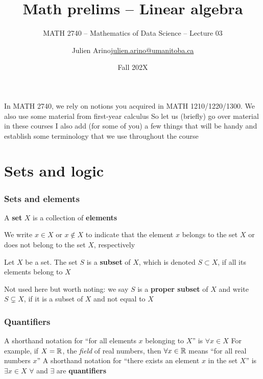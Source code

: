 \documentclass[aspectratio=169]{beamer}\usepackage[]{graphicx}\usepackage[]{xcolor}
\subtitle{MATH 2740 -- Mathematics of Data Science -- Lecture 03}
\author{\texorpdfstring{Julien Arino\newline\url{julien.arino@umanitoba.ca}}{Julien Arino}}
\institute{Department of Mathematics @ University of Manitoba}
\date{Fall 202X}
\title{Math prelims -- Linear algebra}
\begin{document}



\begin{frame}
In MATH 2740, we rely on notions you acquired in MATH 1210/1220/1300. We also use some material from first-year calculus
\vfill
So let us (briefly) go over material in these courses
\vfill
I also add (for some of you) a few things that will be handy and establish some terminology that we use throughout the course
\end{frame}



\section{Sets and logic}

\begin{frame}
\frametitle{Sets and elements}
	\begin{definition}[Set]
		A \textbf{set} $X$ is a collection of \textbf{elements}
	\end{definition}
	We write $x\in X$ or $x\not\in X$ to indicate that the element $x$ belongs to
	the set $X$ or does not belong to the set $X$, respectively
	\vfill
	\begin{definition}[Subset]
		Let $X$ be a set. The set $S$ is a \textbf{subset} of $X$, which is denoted
		$S\subset X$, if all its elements belong to $X$
	\end{definition}
Not used here but worth noting: we say $S$ is a \textbf{proper subset} of $X$ and write $S\subsetneq X$, if it is a subset of $X$ and not equal to $X$
\end{frame}


\begin{frame}
\frametitle{Quantifiers}
	A shorthand notation for ``for all elements $x$ belonging to $X$'' is $\forall x\in X$
	\vfill
	For example, if $X=\mathbb{R}$, the \emph{field} of real numbers, then $\forall x\in\mathbb{R}$ means ``for all real numbers $x$''
	\vfill
	A shorthand notation for ``there exists an element $x$ in the set $X$'' is
	$\exists x\in X$
	\vfill
	$\forall$ and $\exists$ are \textbf{quantifiers}
\end{frame}
\end{document}
